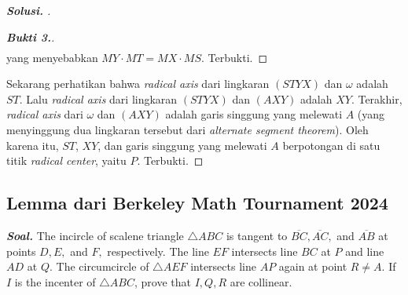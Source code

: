 \documentclass[letterpaper, 13pt]{scrartcl}
\begin{document}
\begin{proof}[\textbf{Solusi. }]
\begin{proof}[\textbf{Bukti 3.}]
\begin{align*}
        \end{align*}
        yang menyebabkan $MY \cdot MT = MX \cdot MS$. Terbukti.
    \end{proof} 
    Sekarang perhatikan bahwa \textit{radical axis} dari lingkaran $(STYX)$ dan $\omega$ adalah $ST$. 
    Lalu \textit{radical axis} dari lingkaran $(STYX)$ dan $(AXY)$ adalah $XY$. 
    Terakhir, \textit{radical axis} dari $\omega$ dan $(AXY)$ adalah garis singgung yang melewati $A$ (yang menyinggung dua lingkaran tersebut dari \textit{alternate segment theorem}).
    Oleh karena itu, $ST$, $XY$, dan garis singgung yang melewati $A$ berpotongan di satu titik \textit{radical center}, yaitu $P$. Terbukti.
\end{proof}

\subsection{Lemma dari Berkeley Math Tournament 2024}

\textbf{\textit{Soal. }}The incircle of scalene triangle $\triangle{ABC}$ is tangent to $\overline{BC}, \overline{AC},$ and $\overline{AB}$ at points $D, E,$ and $F,$ respectively. The line $EF$ intersects line $BC$ at $P$ and line $AD$ at $Q.$ The circumcircle of $\triangle{AEF}$ intersects line $AP$ again at point $R \neq A$. If $I$ is the incenter of $\triangle{ABC}$, prove that $I,Q,R$ are collinear.
\end{document}
